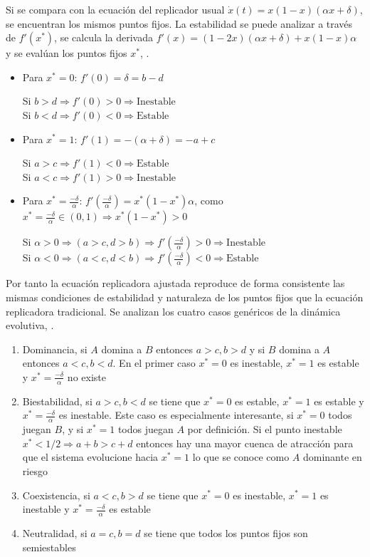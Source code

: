 \documentclass[%
 sor,
 jor,
 amsmath,amssymb,
 reprint,%
]{revtex4-2}
\begin{document}
Si se compara con la ecuación del replicador usual \(\dot{x}(t)=x(1-x)(\alpha x+\delta)\), se encuentran los mismos puntos fijos. La estabilidad se puede analizar a través de $f'(x^*)$, se calcula la derivada $f'(x)=(1-2x)(\alpha x+\delta)+x(1-x)\alpha$ y se evalúan los puntos fijos $x^*$, \cite{CalvoTema2}.

\begin{itemize}
    \item Para \( x^* = 0 \): \( f'(0) =\delta=b-d\)

    Si $b>d \Rightarrow f'(0)>0 \Rightarrow \text{Inestable}$\\
    Si $b<d \Rightarrow f'(0)<0 \Rightarrow \text{Estable}$

     \item Para \( x^* = 1 \): \( f'(1) =-(\alpha +\delta)=-a+c\)

    Si $a>c \Rightarrow f'(1)<0 \Rightarrow \text{Estable}$\\
    Si $a<c \Rightarrow f'(1)>0 \Rightarrow \text{Inestable}$

    \item Para \( x^* = \frac{-\delta}{\alpha} \): \( f'(\frac{-\delta}{\alpha}) =x^*(1-x^*)\alpha\), como \(x^*=\frac{-\delta}{\alpha} \in (0,1) \Rightarrow x^*(1-x^*) >0\)

    Si $\alpha>0 \Rightarrow (a>c,d>b) \Rightarrow f'(\frac{-\delta}{\alpha})>0 \Rightarrow \text{Inestable}$\\
    Si $\alpha<0 \Rightarrow (a<c,d<b) \Rightarrow f'(\frac{-\delta}{\alpha})<0 \Rightarrow \text{Estable}$\\
   
\end{itemize}

Por tanto la ecuación replicadora ajustada reproduce de forma consistente las mismas condiciones de estabilidad y naturaleza de los puntos fijos que la ecuación replicadora tradicional. Se analizan los cuatro casos genéricos de la dinámica evolutiva, \cite{Arne}.

\begin{enumerate}
    \item Dominancia, si $A$ domina a $B$ entonces $a>c,b>d$ y si $B$ domina a $A$ entonces $a<c,b<d$. En el primer caso $x^*=0$ es inestable, $x^*=1$ es estable y $x^*=\frac{-\delta}{\alpha}$ no existe
    \item Biestabilidad, si $a>c,b<d$ se tiene que $x^*=0$ es estable, $x^*=1$ es estable y $x^*=\frac{-\delta}{\alpha}$ es inestable. Este caso es especialmente interesante, si $x^*=0$ todos juegan $B$, y si $x^*=1$ todos juegan $A$ por definición. Si el punto inestable $x^* <1/2 \Rightarrow a+b>c+d$ entonces hay una mayor cuenca de atracción para que el sistema evolucione hacia $x^*=1$ lo que se conoce como $A$ dominante en riesgo
    \item Coexistencia, si $a<c,b>d$ se tiene que $x^*=0$ es inestable, $x^*=1$ es inestable y $x^*=\frac{-\delta}{\alpha}$ es estable
    \item Neutralidad, si $a=c,b=d$ se tiene que todos los puntos fijos son semiestables 
\end{enumerate}
\end{document}
